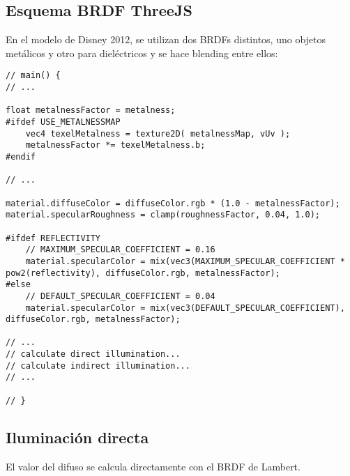     \subsection{Esquema BRDF ThreeJS}
        En el modelo de Disney 2012, se utilizan dos BRDFs distintos, uno objetos metálicos y
        otro para dieléctricos y se hace blending entre ellos:
    \singlespacing
    \begin{lstlisting}[caption=My Javascript Example]
// main() {
// ...

float metalnessFactor = metalness;
#ifdef USE_METALNESSMAP
    vec4 texelMetalness = texture2D( metalnessMap, vUv );
    metalnessFactor *= texelMetalness.b;
#endif

// ...

material.diffuseColor = diffuseColor.rgb * (1.0 - metalnessFactor);
material.specularRoughness = clamp(roughnessFactor, 0.04, 1.0);

#ifdef REFLECTIVITY
    // MAXIMUM_SPECULAR_COEFFICIENT = 0.16
    material.specularColor = mix(vec3(MAXIMUM_SPECULAR_COEFFICIENT * pow2(reflectivity), diffuseColor.rgb, metalnessFactor);
#else
    // DEFAULT_SPECULAR_COEFFICIENT = 0.04
    material.specularColor = mix(vec3(DEFAULT_SPECULAR_COEFFICIENT), diffuseColor.rgb, metalnessFactor);

// ...
// calculate direct illumination...
// calculate indirect illumination...
// ...
                                 
// }
    \end{lstlisting}

    \subsection{Iluminaci\'on directa}
        El valor del difuso se calcula directamente con el BRDF de Lambert.

